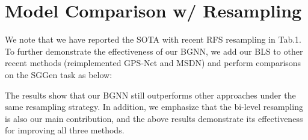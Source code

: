 
\section{Model Comparison w/ Resampling}
We note that we have reported the SOTA with recent RFS resampling in Tab.1. To further demonstrate the effectiveness of our BGNN, we add our BLS to other recent methods (reimplemented GPS-Net and MSDN) and perform comparisons on the SGGen task as below:
\begin{table}[ht]
   \centering
       \caption{\textbf{The performance comparison between SOTA with our BLS.}}
\end{table}

The results show that our BGNN still outperforms other approaches under the same resampling strategy. In addition, we emphasize that the bi-level resampling is also our main contribution, and the above results demonstrate its effectiveness for improving all three methods.


